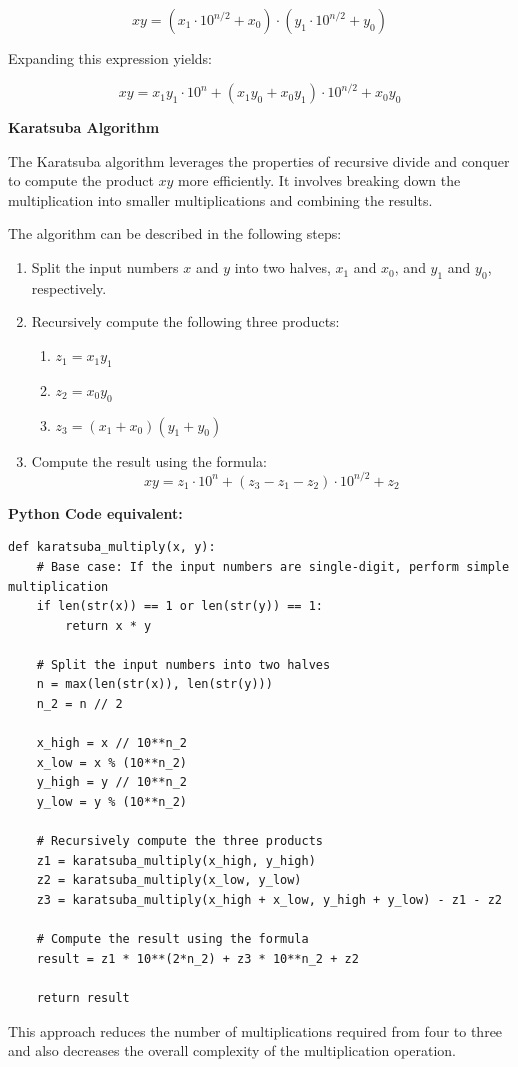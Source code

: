 \documentclass[12pt]{book} %
\begin{document}
\[ xy = (x_1 \cdot 10^{n/2} + x_0) \cdot (y_1 \cdot 10^{n/2} + y_0) \]

Expanding this expression yields:

\[ xy = x_1y_1 \cdot 10^n + (x_1y_0 + x_0y_1) \cdot 10^{n/2} + x_0y_0 \]

\textbf{Karatsuba Algorithm}

The Karatsuba algorithm leverages the properties of recursive divide and conquer to compute the product \(xy\) more efficiently. It involves breaking down the multiplication into smaller multiplications and combining the results.

The algorithm can be described in the following steps:

\begin{enumerate}
    \item Split the input numbers \(x\) and \(y\) into two halves, \(x_1\) and \(x_0\), and \(y_1\) and \(y_0\), respectively.
    \item Recursively compute the following three products:
    \begin{enumerate}
        \item \(z_1 = x_1y_1\)
        \item \(z_2 = x_0y_0\)
        \item \(z_3 = (x_1 + x_0)(y_1 + y_0)\)
    \end{enumerate}
    \item Compute the result using the formula:
    \[ xy = z_1 \cdot 10^n + (z_3 - z_1 - z_2) \cdot 10^{n/2} + z_2 \]
\end{enumerate}

\textbf{Python Code equivalent:}
\FloatBarrier
\begin{lstlisting}
def karatsuba_multiply(x, y):
    # Base case: If the input numbers are single-digit, perform simple multiplication
    if len(str(x)) == 1 or len(str(y)) == 1:
        return x * y
    
    # Split the input numbers into two halves
    n = max(len(str(x)), len(str(y)))
    n_2 = n // 2
    
    x_high = x // 10**n_2
    x_low = x % (10**n_2)
    y_high = y // 10**n_2
    y_low = y % (10**n_2)
    
    # Recursively compute the three products
    z1 = karatsuba_multiply(x_high, y_high)
    z2 = karatsuba_multiply(x_low, y_low)
    z3 = karatsuba_multiply(x_high + x_low, y_high + y_low) - z1 - z2
    
    # Compute the result using the formula
    result = z1 * 10**(2*n_2) + z3 * 10**n_2 + z2
    
    return result
\end{lstlisting}
This approach reduces the number of multiplications required from four to three and also decreases the overall complexity of the multiplication operation.
\end{document}
